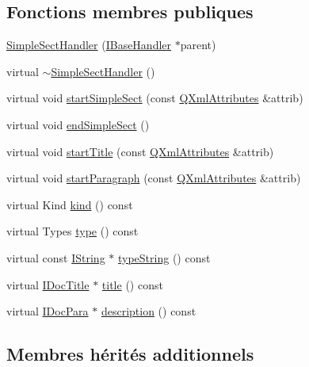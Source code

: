 \subsection*{Fonctions membres publiques}
\begin{DoxyCompactItemize}
\item 
\hyperlink{class_simple_sect_handler_a55ec7f38e36cfa300bbc1d80583b35ef}{Simple\+Sect\+Handler} (\hyperlink{class_i_base_handler}{I\+Base\+Handler} $\ast$parent)
\item 
virtual \hyperlink{class_simple_sect_handler_a55eb4ebde694cbc81a5558bd16feaeff}{$\sim$\+Simple\+Sect\+Handler} ()
\item 
virtual void \hyperlink{class_simple_sect_handler_a2d1574a2a5b5cf78bd5686d9d24dbeb8}{start\+Simple\+Sect} (const \hyperlink{class_q_xml_attributes}{Q\+Xml\+Attributes} \&attrib)
\item 
virtual void \hyperlink{class_simple_sect_handler_a339aa93922947bed597ade0e7663e8b0}{end\+Simple\+Sect} ()
\item 
virtual void \hyperlink{class_simple_sect_handler_a79017376feedc52e686a890a800a8808}{start\+Title} (const \hyperlink{class_q_xml_attributes}{Q\+Xml\+Attributes} \&attrib)
\item 
virtual void \hyperlink{class_simple_sect_handler_a8d2cceaace4546315fb088f805086c62}{start\+Paragraph} (const \hyperlink{class_q_xml_attributes}{Q\+Xml\+Attributes} \&attrib)
\item 
virtual Kind \hyperlink{class_simple_sect_handler_a05ace6ef8880d51978f92d2689a1adef}{kind} () const 
\item 
virtual Types \hyperlink{class_simple_sect_handler_aaaff32e3d4d98dbbe632678d8c48e480}{type} () const 
\item 
virtual const \hyperlink{class_i_string}{I\+String} $\ast$ \hyperlink{class_simple_sect_handler_a141e6c36ddaeffb3780fda08fa31cfcf}{type\+String} () const 
\item 
virtual \hyperlink{class_i_doc_title}{I\+Doc\+Title} $\ast$ \hyperlink{class_simple_sect_handler_a507cc7d19454f4907cf227e6e9b44871}{title} () const 
\item 
virtual \hyperlink{class_i_doc_para}{I\+Doc\+Para} $\ast$ \hyperlink{class_simple_sect_handler_aa7d8d73e2fde07f8052c30885d48e080}{description} () const 
\end{DoxyCompactItemize}
\subsection*{Membres hérités additionnels}


